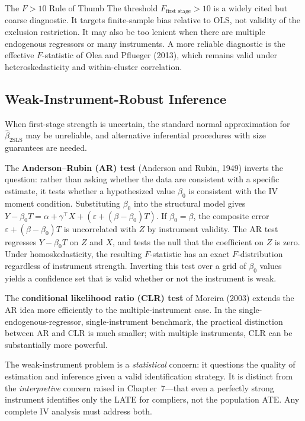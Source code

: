 \documentclass[master.tex]{subfiles}
\begin{document}
\begin{warn}{The $F > 10$ Rule of Thumb}
The threshold $F_{\text{first stage}} > 10$ is a widely cited but
coarse diagnostic.  It targets finite-sample bias relative to OLS,
not validity of the exclusion restriction.  It may also be too lenient
when there are multiple endogenous regressors or many instruments.
A more reliable diagnostic is the effective $F$-statistic of Olea and
Pflueger (2013), which remains valid under heteroskedasticity and
within-cluster correlation.
\end{warn}

\subsection{Weak-Instrument-Robust Inference}

When first-stage strength is uncertain, the standard normal
approximation for $\hat\beta_{\mathrm{2SLS}}$ may be unreliable, and
alternative inferential procedures with size guarantees are needed.

The \textbf{Anderson--Rubin (AR) test} (Anderson and Rubin, 1949)
inverts the question: rather than asking whether the data are
consistent with a specific estimate, it tests whether a hypothesized
value $\beta_0$ is consistent with the IV moment condition.
Substituting $\beta_0$ into the structural model gives
$Y - \beta_0 T = \alpha + \gamma^\top X + (\varepsilon + (\beta - \beta_0) T)$.
If $\beta_0 = \beta$, the composite error $\varepsilon + (\beta - \beta_0) T$
is uncorrelated with $Z$ by instrument validity.
The AR test regresses $Y - \beta_0 T$ on $Z$ and $X$, and tests the
null that the coefficient on $Z$ is zero.  Under homoskedasticity,
the resulting $F$-statistic has an exact $F$-distribution regardless
of instrument strength.  Inverting this test over a grid of $\beta_0$
values yields a confidence set that is valid whether or not the
instrument is weak.

The \textbf{conditional likelihood ratio (CLR) test} of Moreira
(2003) extends the AR idea more efficiently to the multiple-instrument
case.  In the single-endogenous-regressor, single-instrument benchmark,
the practical distinction between AR and CLR is much smaller; with
multiple instruments, CLR can be substantially more powerful.

\begin{remark}
The weak-instrument problem is a \emph{statistical} concern: it
questions the quality of estimation and inference given a valid
identification strategy.  It is distinct from the \emph{interpretive}
concern raised in Chapter~7---that even a perfectly strong instrument
identifies only the LATE for compliers, not the population ATE.
Any complete IV analysis must address both.
\end{remark}
\end{document}
